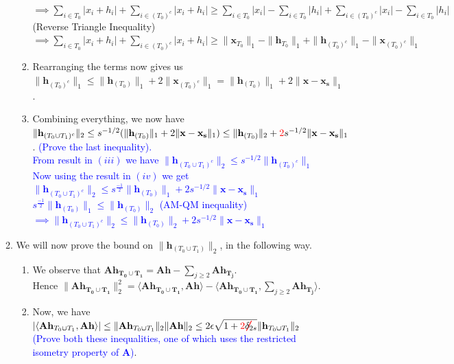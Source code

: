 \documentclass[11pt]{article}
\begin{document}
\begin{enumerate}
\begin{enumerate}
\begin{enumerate}
{$\implies \sum_{i \in T_0} |x_i + h_i| + \sum_{i \in {(T_0)}^c} |x_i + h_i| \geq \sum_{i \in T_0} |x_i| - \sum_{i \in T_0}|h_i| + \sum_{i \in {(T_0)}^c} |x_i| - \sum_{i \in T_0}|h_i|$ (Reverse Triangle Inequality)\\
$\implies \sum_{i \in T_0} |x_i + h_i| + \sum_{i \in {(T_0)}^c} |x_i + h_i| \geq \|\mathbf{x}_{T_0}\|_1 - \|\mathbf{h}_{T_0}\|_1 + \|\mathbf{h}_{{(T_0)}^c}\|_1 - \|\mathbf{x}_{{(T_0)^c}}\|_1$}
\item Rearranging the terms now gives us $\|\mathbf{h}_{{(T_0)}^c}\|_1 \leq \|\mathbf{h}_{{(T_0)}}\|_1  + 2\|\mathbf{x}_{{(T_0)^c}}\|_1 = \|\mathbf{h}_{{(T_0)}}\|_1  + 2\|\mathbf{x}-\mathbf{x_s}\|_1$. 
\item Combining everything, we now have $\|\mathbf{h}_{(T_0 \cup T_1)^c}\|_2 \leq s^{-1/2}(\|\mathbf{h}_{{(T_0)}}\|_1  + 2\|\mathbf{x}-\mathbf{x_s}\|_1) \leq \|\mathbf{h}_{{(T_0)}}\|_2 + \textcolor{red}{2}s^{-1/2} \|\mathbf{x}-\mathbf{x_s}\|_1$. \textcolor{blue}{(Prove the last inequality).}\\
\textcolor{blue}{From result in $(iii)$ we have $\|\mathbf{h}_{(T_0 \cup T_1)^c}\|_2 \leq s^{-1/2}\|\mathbf{h}_{(T_0)^c}\|_1$\\
Now using the result in $(iv)$ we get $\|\mathbf{h}_{(T_0 \cup T_1)^c}\|_2 \leq s^\frac{-1}{2}\|\mathbf{h}_{{(T_0)}}\|_1 + 2s^{-1/2} \|\mathbf{x}-\mathbf{x_s}\|_1 $\\
$s^\frac{-1}{2}\|\mathbf{h}_{{(T_0)}}\|_1 \leq \|\mathbf{h}_{{(T_0)}}\|_2$ (AM-QM inequality)\\
$\implies \|\mathbf{h}_{(T_0 \cup T_1)^c}\|_2 \leq \|\mathbf{h}_{{(T_0)}}\|_2 + 2s^{-1/2} \|\mathbf{x}-\mathbf{x_s}\|_1$}
\end{enumerate}
\item We will now prove the bound on $\|\mathbf{h}_{(T_0 \cup T_1)}\|_2$, in the following way. 
\begin{enumerate}
\item We observe that $\mathbf{Ah_{T_0 \cup T_1}} = \mathbf{Ah} - \sum_{j \geq 2} \mathbf{Ah_{T_j}}$. \\
Hence $\|\mathbf{Ah_{T_0 \cup T_1}}\|^2_2 = \langle \mathbf{Ah_{T_0 \cup T_1}} , \mathbf{Ah}\rangle - \langle \mathbf{Ah_{T_0 \cup T_1}} , \sum_{j \geq 2} \mathbf{Ah_{T_j}}\rangle$.
\item Now, we have $|\langle \mathbf{Ah}_{T_0 \cup T_1} , \mathbf{Ah}\rangle| \leq \|\mathbf{Ah}_{T_0 \cup T_1}\|_2 \|\mathbf{Ah}\|_2 \leq 2 \epsilon \sqrt{1 + \textcolor{red}{\cancel{2}}\delta_{2s}} \|\mathbf{h}_{T_0 \cup T_1}\|_2$ \textcolor{blue}{(Prove both these inequalities, one of which uses the restricted isometry property of $\mathbf{A}$)}.\\

\end{enumerate}
\end{enumerate}
\end{enumerate}
\end{document}
